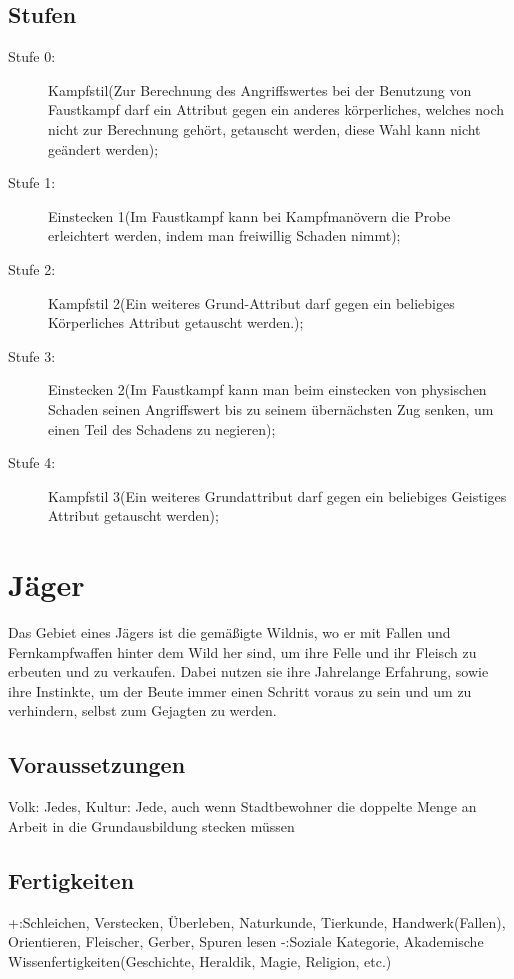 \documentclass[a4paper,12pt,oneside]{book}
\begin{document}
\subsection{Stufen}
\begin{description}
\item[Stufe 0:]Kampfstil(Zur Berechnung des Angriffswertes bei der Benutzung von Faustkampf darf ein Attribut gegen ein anderes körperliches, welches noch nicht zur Berechnung gehört, getauscht werden, diese Wahl kann nicht geändert werden); 
\item[Stufe 1:]Einstecken 1(Im Faustkampf kann bei Kampfmanövern die Probe erleichtert werden, indem man freiwillig Schaden nimmt);
\item[Stufe 2:]Kampfstil 2(Ein weiteres Grund-Attribut darf gegen ein beliebiges Körperliches Attribut getauscht werden.);
\item[Stufe 3:]Einstecken 2(Im Faustkampf kann man beim einstecken von physischen Schaden seinen Angriffswert bis zu seinem übernächsten Zug senken, um einen Teil des Schadens zu negieren);
\item[Stufe 4:]Kampfstil 3(Ein weiteres Grundattribut darf gegen ein beliebiges Geistiges Attribut getauscht werden);
\end{description}

\section{Jäger}
Das Gebiet eines Jägers ist die gemäßigte Wildnis, wo er mit Fallen und Fernkampfwaffen hinter dem Wild her sind, um ihre Felle und ihr Fleisch zu erbeuten und zu verkaufen. Dabei nutzen sie ihre Jahrelange Erfahrung, sowie ihre Instinkte, um der Beute immer einen Schritt voraus zu sein und um zu verhindern, selbst zum Gejagten zu werden.
\subsection{Voraussetzungen}
Volk: Jedes, Kultur: Jede, auch wenn Stadtbewohner die doppelte Menge an Arbeit in die Grundausbildung stecken müssen
\subsection{Fertigkeiten}
+:Schleichen, Verstecken, Überleben, Naturkunde, Tierkunde, Handwerk(Fallen), Orientieren, Fleischer, Gerber, Spuren lesen
-:Soziale Kategorie, Akademische Wissenfertigkeiten(Geschichte, Heraldik, Magie, Religion, etc.)
\end{document}
